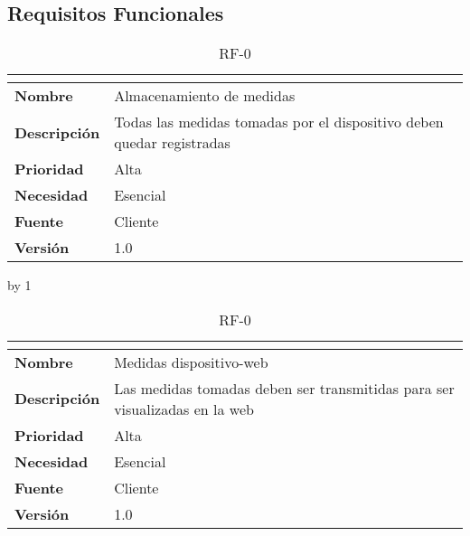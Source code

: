 \subsection{Requisitos Funcionales}\label{subsec:requisitos-funcionales}
\newcount\rf
{}
\begin{table}[H]
	\caption{RF-0\number\rf}
	\begin{tabular}{|l|p{}|}
		\hline
		\multicolumn{2}{|c|}{\cellcolor[HTML]{BFBFBF}{\color[HTML]{000000} \textbf{RF-0\number\rf}}} \\ \hline
		\textbf{Nombre}      & Almacenamiento de medidas                                             \\ \hline
		\textbf{Descripción} & Todas las medidas tomadas por el dispositivo deben quedar registradas \\ \hline
		\textbf{Prioridad}   & Alta                                                                  \\ \hline
		\textbf{Necesidad}   & Esencial                                                              \\ \hline
		\textbf{Fuente}      & Cliente                                                               \\ \hline
		\textbf{Versión}     & 1.0                                                                   \\ \hline
	\end{tabular}
\end{table}
\advance\rf by 1
\begin{table}[H]
	\caption{RF-0\number\rf}
	\begin{tabular}{|l|p{}|}
		\hline
		\multicolumn{2}{|c|}{\cellcolor[HTML]{BFBFBF}{\color[HTML]{000000} \textbf{RF-0\number\rf}}} \\ \hline
		\textbf{Nombre}      & Medidas dispositivo-web                                                    \\ \hline
		\textbf{Descripción} & Las medidas tomadas deben ser transmitidas para ser visualizadas en la web \\ \hline
		\textbf{Prioridad}   & Alta                                                                       \\ \hline
		\textbf{Necesidad}   & Esencial                                                                   \\ \hline
		\textbf{Fuente}      & Cliente                                                                    \\ \hline
		\textbf{Versión}     & 1.0                                                                        \\ \hline
	\end{tabular}
\end{table}
